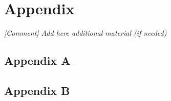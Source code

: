 \section{Appendix}
\textit{[Comment] Add here additional material (if needed)} 
\subsection{Appendix A}

\subsection{Appendix B}
